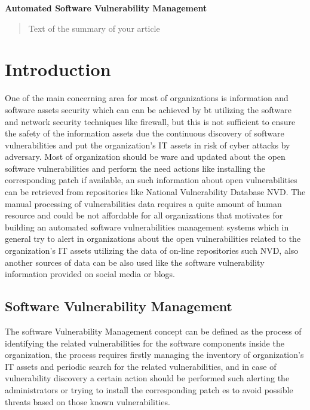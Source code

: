 \documentclass{llncs}
\begin{document}
\begin{flushleft}

\LARGE\bf Automated Software Vulnerability Management

\end{flushleft}

\newpage

\tableofcontents

\newpage


\begin{abstract}
Text of the summary of your article
\end{abstract}
\newpage
\section{Introduction}

One of the main concerning area for most of organizations is information and software assets security which can can be achieved by
bt utilizing the software and network security techniques like firewall, but this is not sufficient to ensure the safety of the information assets due the continuous discovery of software vulnerabilities and put the organization's IT assets in risk of cyber attacks  by adversary. Most of organization should be ware and updated about the open software vulnerabilities and perform the need actions like installing the corresponding patch if available, an such information about open vulnerabilities can be retrieved from repositories like National Vulnerability Database NVD. 
The manual processing of vulnerabilities data requires a quite amount of human resource and could be not affordable for all organizations that motivates for building an  automated software vulnerabilities management systems  which in general try to alert in organizations about the open vulnerabilities related to the organization's IT assets utilizing the data of on-line repositories such NVD, also another sources of data can be also used like the software vulnerability information provided on social media or blogs.
         
\subsection{Software Vulnerability Management}

The software Vulnerability Management concept can be defined as the process of identifying the related vulnerabilities for the software components inside the organization, the process requires firstly managing the inventory of organization's IT assets and periodic search for the related vulnerabilities, and in case of vulnerability discovery a certain action should be performed such alerting the administrators or trying to install the corresponding patch es to avoid possible threats based on those known vulnerabilities.     
\newpage
\end{document}
